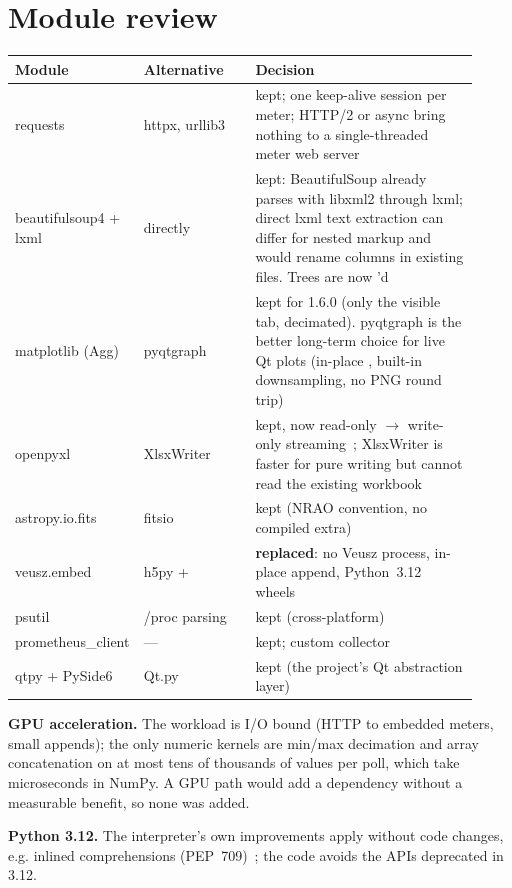 \documentclass[11pt,a4paper]{article}
\newcommand{\code}[1]{\texttt{\detokenize{#1}}}
\begin{document}
\section{Module review}
\begin{longtable}{@{}p{0.2\linewidth}p{0.24\linewidth}p{0.48\linewidth}@{}}
\toprule
Module & Alternative & Decision \\
\midrule
\endhead
requests & httpx, urllib3 & kept; one keep-alive session per meter; HTTP/2 or async bring nothing to a single-threaded meter web server \\
beautifulsoup4 + lxml & \code{lxml.html} directly & kept: BeautifulSoup already parses with libxml2 through lxml; direct lxml text extraction can differ for nested markup and would rename columns in existing files. Trees are now \code{decompose()}'d \\
matplotlib (Agg) & pyqtgraph & kept for 1.6.0 (only the visible tab, decimated). pyqtgraph is the better long-term choice for live Qt plots (in-place \code{setData}, built-in downsampling, no PNG round trip) \\
openpyxl & XlsxWriter & kept, now read-only $\rightarrow$ write-only streaming~\cite{openpyxl_opt}; XlsxWriter is faster for pure writing but cannot read the existing workbook \\
astropy.io.fits & fitsio & kept (NRAO convention, no compiled extra) \\
veusz.embed & h5py + \code{vszh5_writer} & \textbf{replaced}: no Veusz process, in-place append, Python~3.12 wheels \\
psutil & /proc parsing & kept (cross-platform) \\
prometheus\_client & --- & kept; custom collector \\
qtpy + PySide6 & Qt.py & kept (the project's Qt abstraction layer) \\
\bottomrule
\end{longtable}

\noindent\textbf{GPU acceleration.} The workload is I/O bound (HTTP to embedded
meters, small appends); the only numeric kernels are min/max decimation and
array concatenation on at most tens of thousands of values per poll, which take
microseconds in NumPy. A GPU path would add a dependency without a measurable
benefit, so none was added.

\noindent\textbf{Python 3.12.} The interpreter's own improvements apply
without code changes, e.g. inlined comprehensions (PEP~709)~\cite{py312}; the
code avoids the APIs deprecated in 3.12.
\end{document}
